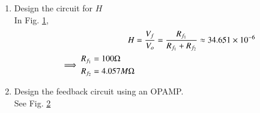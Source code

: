 \begin{enumerate}[label=\arabic*.,ref=\theenumi]
%
\item Design the circuit for $H$\\
\solution In Fig. 	\ref{fig:ee18btech11016_figb},
%
\begin{align}
    H &= \frac{V_{f}}{V_{o}} = \frac{R_{f_{1}}}{R_{f_{1}}+R_{f_{2}}} \approx 34.651\times10^{-6}
\\
\implies 
\begin{split}
    R_{f_{1}} &= 100\ohm\\
    R_{f_{2}} &= 4.057M\ohm
\end{split}
\end{align}
\begin{figure}[ht!]
	\begin{center}
		\resizebox{\columnwidth/2}{!}{}
	\end{center}
	\caption{}
	\label{fig:ee18btech11016_figb}
\end{figure}

\item Design the feedback circuit using an OPAMP.
\\
\solution See Fig. 	\ref{fig:ee18btech11016_figc}

\begin{figure}[ht!]
	\begin{center}
		\resizebox{\columnwidth}{!}{}
	\end{center}
	\caption{}
	\label{fig:ee18btech11016_figc}
\end{figure}


\end{enumerate}
